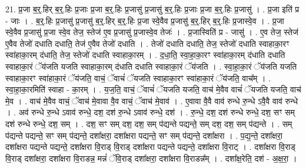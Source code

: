\documentclass[17pt]{extarticle}
\begin{document}
21. प्र॒जा ब॒र्॒.हिर् ब॒र्॒.हिः प्र॒जाः प्र॒जा ब॒र्॒.हिः प्र॒जासु॑ प्र॒जासु॑ ब॒र्॒.हिः प्र॒जाः प्र॒जा ब॒र्॒.हिः प्र॒जासु॑ । . प्र॒जा इति॑ प्र - जाः । . ब॒र्॒.हिः प्र॒जासु॑ प्र॒जासु॑ ब॒र्॒.हिर् ब॒र्॒.हिः प्र॒जा स्वे॒वैव प्र॒जासु॑ ब॒र्॒.हिर् ब॒र्॒.हिः प्र॒जास्वे॒व । . प्र॒जा स्वे॒वैव प्र॒जासु॑ प्र॒जा स्वे॒व तेज॒ स्तेज॑ ए॒व प्र॒जासु॑ प्र॒जास्वे॒व तेजः॑ । . प्र॒जास्विति॑ प्र - जासु॑ । . ए॒व तेज॒ स्तेज॑ ए॒वैव तेजो॑ दधाति दधाति॒ तेज॑ ए॒वैव तेजो॑ दधाति । . तेजो॑ दधाति दधाति॒ तेज॒ स्तेजो॑ दधाति स्वाहाका॒रꣳ स्वा॑हाका॒रम् द॑धाति॒ तेज॒ स्तेजो॑ दधाति स्वाहाका॒रम् । . द॒धा॒ति॒ स्वा॒हा॒का॒रꣳ स्वा॑हाका॒रम् द॑धाति दधाति स्वाहाका॒रं ॅय॑जति यजति स्वाहाका॒रम् द॑धाति दधाति स्वाहाका॒रं ॅय॑जति । . स्वा॒हा॒का॒रं ॅय॑जति यजति स्वाहाका॒रꣳ स्वा॑हाका॒रं ॅय॑जति॒ वाचं॒ ॅवाचं॑ ॅयजति स्वाहाका॒रꣳ स्वा॑हाका॒रं ॅय॑जति॒ वाच᳚म् । . स्वा॒हा॒का॒रमिति॑ स्वाहा - का॒रम् । . य॒ज॒ति॒ वाचं॒ ॅवाचं॑ ॅयजति यजति॒ वाच॑ मे॒वैव वाचं॑ ॅयजति यजति॒ वाच॑ मे॒व । . वाच॑ मे॒वैव वाचं॒ ॅवाच॑ मे॒वावा वै॒व वाचं॒ ॅवाच॑ मे॒वाव॑ । . ए॒वावा वै॒वै वाव॑ रुन्धे रु॒न्धे ऽवै॒वै वाव॑ रुन्धे । . अव॑ रुन्धे रु॒न्धे ऽवाव॑ रुन्धे॒ दश॒ दश॑ रु॒न्धे ऽवाव॑ रुन्धे॒ दश॑ । . रु॒न्धे॒ दश॒ दश॑ रुन्धे रुन्धे॒ दश॒ सꣳ सम् दश॑ रुन्धे रुन्धे॒ दश॒ सम् । . दश॒ सꣳ सम् दश॒ दश॒ सम् प॑द्यन्ते पद्यन्ते॒ सम् दश॒ दश॒ सम् प॑द्यन्ते । . सम् प॑द्यन्ते पद्यन्ते॒ सꣳ सम् प॑द्यन्ते॒ दशा᳚क्षरा॒ दशा᳚क्षरा पद्यन्ते॒ सꣳ सम् प॑द्यन्ते॒ दशा᳚क्षरा । . प॒द्य॒न्ते॒ दशा᳚क्षरा॒ दशा᳚क्षरा पद्यन्ते पद्यन्ते॒ दशा᳚क्षरा वि॒राड् वि॒राड् दशा᳚क्षरा पद्यन्ते पद्यन्ते॒ दशा᳚क्षरा वि॒राट् । . दशा᳚क्षरा वि॒राड् वि॒राड् दशा᳚क्षरा॒ दशा᳚क्षरा वि॒राडन्न॒ मन्नं॑ ॅवि॒राड् दशा᳚क्षरा॒ दशा᳚क्षरा वि॒राडन्न᳚म् । . दशा᳚क्ष॒रेति॒ दश॑ - अ॒क्ष॒रा॒ । \newline
\end{document}
